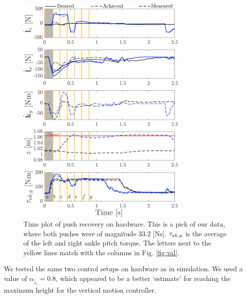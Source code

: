 \documentclass[letterpaper, 10 pt, conference]{ieeeconf}  %
\begin{document}
\begin{figure}[h]
      \centering
      \includegraphics[width=3.3in]{valcomparetimeHW.png}
      \caption{Time plot of push recovery on hardware. This is a pick of our data, where both pushes were of magnitude $33.2$ [Ns]. $\boldmath{\tau}_{ak,y}$ is the average of the left and right ankle pitch torque. The letters next to the yellow lines match with the columns in Fig. \ref{fig:val}. }
      \label{fig:valcomparetimeHW}
\end{figure}
We tested the same two control setups on hardware as in simulation. We used a value of $\alpha_{\hat{\ddot{z}}_{c}}=0.8$, which appeared to be a better `estimate' for reaching the maximum height for the vertical motion controller.
\end{document}
